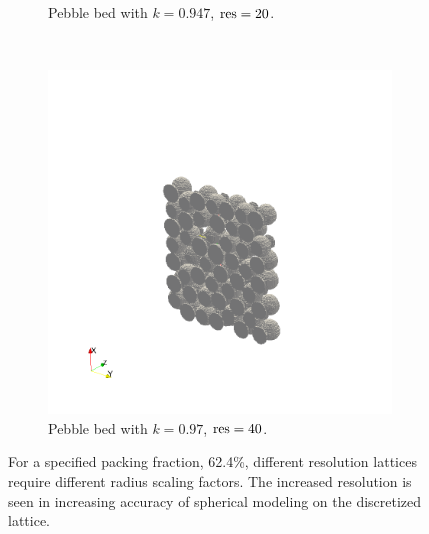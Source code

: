 \begin{figure}[ht]
\begin{subfigure}[b]{0.3\textwidth}
                \caption{Pebble bed with $k = 0.947$, $\text{res} = 20$.}
                \label{fig:k0947res20}
        \end{subfigure}%
        ~
        \begin{subfigure}[b]{0.3\textwidth}
                \includegraphics[width=\textwidth, trim={200pt, 150pt, 200pt, 200pt},clip]{figures/lbm/k097res40}
                \caption{Pebble bed with $k = 0.97$, $\text{res} = 40$.}
                \label{fig:k097res40}
        \end{subfigure}
        \caption{For a specified packing fraction, 62.4\%, different resolution lattices require different radius scaling factors. The increased resolution is seen in increasing accuracy of spherical modeling on the discretized lattice.}\label{fig:3d-dem-lbm-mapping}
\end{figure}

